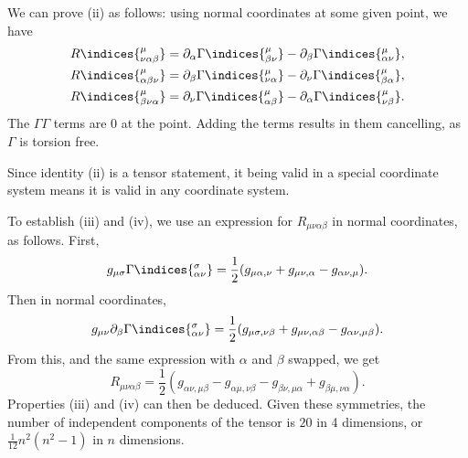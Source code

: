 \documentclass[12pt]{article}
\begin{document}
We can prove (ii) as follows: using normal coordinates at some given point, we have
\begin{align*}
	R\indices{^\mu_{\nu\alpha\beta}} &= \partial_\alpha \Gamma\indices{^\mu_{\beta\nu}} - \partial_\beta \Gamma\indices{^\mu_{\alpha\nu}}, \\
	R\indices{^\mu_{\alpha\beta\nu}} &= \partial_\beta \Gamma\indices{^\mu_{\nu\alpha}} - \partial_\nu \Gamma\indices{^\mu_{\beta\alpha}}, \\
	R\indices{^\mu_{\beta\nu\alpha}} &= \partial_\nu \Gamma\indices{^\mu_{\alpha\beta}} - \partial_\alpha \Gamma\indices{^\mu_{\nu\beta}}.
\end{align*}
The $\Gamma\Gamma$ terms are $0$ at the point. Adding the terms results in them cancelling, as $\Gamma$ is torsion free.

Since identity (ii) is a tensor statement, it being valid in a special coordinate system means it is valid in any coordinate system.

To establish (iii) and (iv), we use an expression for $R_{\mu\nu\alpha\beta}$ in normal coordinates, as follows. First,
\[
g_{\mu\sigma} \Gamma\indices{^{\sigma}_{\alpha\nu}}= \frac{1}{2}(g_{\mu\alpha,\nu} + g_{\mu\nu,\alpha} - g_{\alpha\nu,\mu}).
\]
Then in normal coordinates,
\[
g_{\mu\nu}\partial_\beta \Gamma\indices{^{\sigma}_{\alpha\nu}} = \frac{1}{2} (g_{\mu\sigma,\nu\beta} + g_{\mu\nu,\alpha\beta} - g_{\alpha\nu,\mu\beta}).
\]
From this, and the same expression with $\alpha$ and $\beta$ swapped, we get
\[
R_{\mu\nu\alpha\beta} = \frac{1}{2}(g_{\alpha\nu,\mu\beta} - g_{\alpha\mu,\nu\beta} - g_{\beta\nu,\mu\alpha} + g_{\beta\mu,\nu\alpha}).
\]
Properties (iii) and (iv) can then be deduced. Given these symmetries, the number of independent components of the tensor is $20$ in 4 dimensions, or $\frac{1}{12} n^2(n^2 -1)$ in $n$ dimensions.
\end{document}
